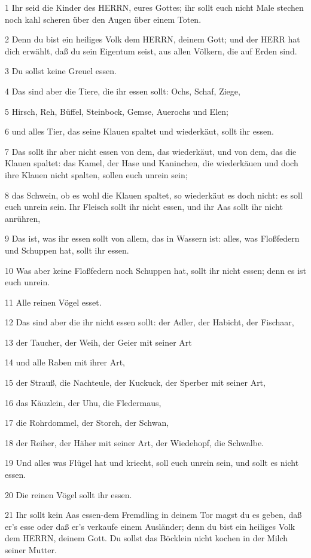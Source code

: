 \par 1 Ihr seid die Kinder des HERRN, eures Gottes; ihr sollt euch nicht Male stechen noch kahl scheren über den Augen über einem Toten.
\par 2 Denn du bist ein heiliges Volk dem HERRN, deinem Gott; und der HERR hat dich erwählt, daß du sein Eigentum seist, aus allen Völkern, die auf Erden sind.
\par 3 Du sollst keine Greuel essen.
\par 4 Das sind aber die Tiere, die ihr essen sollt: Ochs, Schaf, Ziege,
\par 5 Hirsch, Reh, Büffel, Steinbock, Gemse, Auerochs und Elen;
\par 6 und alles Tier, das seine Klauen spaltet und wiederkäut, sollt ihr essen.
\par 7 Das sollt ihr aber nicht essen von dem, das wiederkäut, und von dem, das die Klauen spaltet: das Kamel, der Hase und Kaninchen, die wiederkäuen und doch ihre Klauen nicht spalten, sollen euch unrein sein;
\par 8 das Schwein, ob es wohl die Klauen spaltet, so wiederkäut es doch nicht: es soll euch unrein sein. Ihr Fleisch sollt ihr nicht essen, und ihr Aas sollt ihr nicht anrühren,
\par 9 Das ist, was ihr essen sollt von allem, das in Wassern ist: alles, was Floßfedern und Schuppen hat, sollt ihr essen.
\par 10 Was aber keine Floßfedern noch Schuppen hat, sollt ihr nicht essen; denn es ist euch unrein.
\par 11 Alle reinen Vögel esset.
\par 12 Das sind aber die ihr nicht essen sollt: der Adler, der Habicht, der Fischaar,
\par 13 der Taucher, der Weih, der Geier mit seiner Art
\par 14 und alle Raben mit ihrer Art,
\par 15 der Strauß, die Nachteule, der Kuckuck, der Sperber mit seiner Art,
\par 16 das Käuzlein, der Uhu, die Fledermaus,
\par 17 die Rohrdommel, der Storch, der Schwan,
\par 18 der Reiher, der Häher mit seiner Art, der Wiedehopf, die Schwalbe.
\par 19 Und alles was Flügel hat und kriecht, soll euch unrein sein, und sollt es nicht essen.
\par 20 Die reinen Vögel sollt ihr essen.
\par 21 Ihr sollt kein Aas essen-dem Fremdling in deinem Tor magst du es geben, daß er's esse oder daß er's verkaufe einem Ausländer; denn du bist ein heiliges Volk dem HERRN, deinem Gott. Du sollst das Böcklein nicht kochen in der Milch seiner Mutter.
